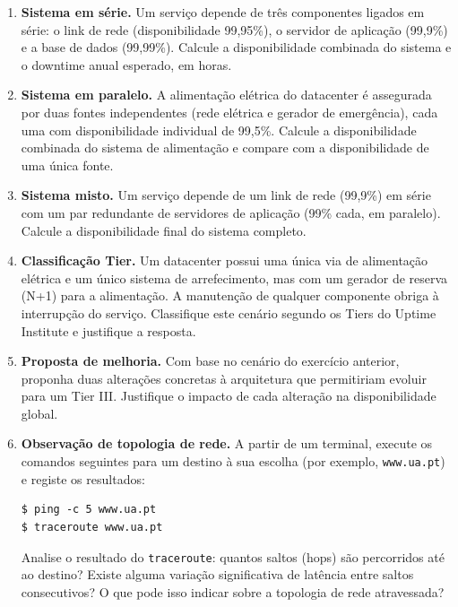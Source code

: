 \documentclass[11pt,a4paper]{article}
\begin{document}
\begin{enumerate}[label=\arabic*.]
  \item \textbf{Sistema em série.} Um serviço depende de três componentes ligados em série: o link de rede (disponibilidade 99,95\%), o servidor de aplicação (99,9\%) e a base de dados (99,99\%). Calcule a disponibilidade combinada do sistema e o downtime anual esperado, em horas.
  \vspace{2cm}

  \item \textbf{Sistema em paralelo.} A alimentação elétrica do datacenter é assegurada por duas fontes independentes (rede elétrica e gerador de emergência), cada uma com disponibilidade individual de 99,5\%. Calcule a disponibilidade combinada do sistema de alimentação e compare com a disponibilidade de uma única fonte.
  \vspace{2cm}

  \item \textbf{Sistema misto.} Um serviço depende de um link de rede (99,9\%) em série com um par redundante de servidores de aplicação (99\% cada, em paralelo). Calcule a disponibilidade final do sistema completo.
  \vspace{2cm}

  \item \textbf{Classificação Tier.} Um datacenter possui uma única via de alimentação elétrica e um único sistema de arrefecimento, mas com um gerador de reserva (N+1) para a alimentação. A manutenção de qualquer componente obriga à interrupção do serviço. Classifique este cenário segundo os Tiers do Uptime Institute e justifique a resposta.
  \vspace{2cm}

  \item \textbf{Proposta de melhoria.} Com base no cenário do exercício anterior, proponha duas alterações concretas à arquitetura que permitiriam evoluir para um Tier III. Justifique o impacto de cada alteração na disponibilidade global.
  \vspace{2cm}

  \item \textbf{Observação de topologia de rede.} A partir de um terminal, execute os comandos seguintes para um destino à sua escolha (por exemplo, \texttt{www.ua.pt}) e registe os resultados:
\begin{lstlisting}
$ ping -c 5 www.ua.pt
$ traceroute www.ua.pt
\end{lstlisting}
  Analise o resultado do \texttt{traceroute}: quantos saltos (hops) são percorridos até ao destino? Existe alguma variação significativa de latência entre saltos consecutivos? O que pode isso indicar sobre a topologia de rede atravessada?
  \vspace{1cm}


\end{enumerate}
\end{document}
